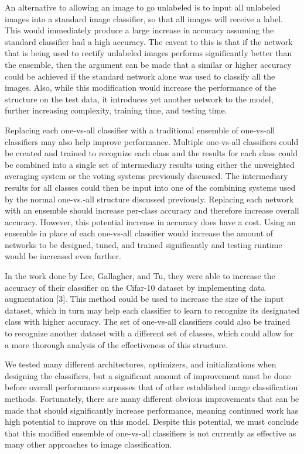\documentclass[10pt,twocolumn,letterpaper]{article}
\begin{document}
An alternative to allowing an image to go unlabeled is to input all unlabeled images into a standard image classifier, so that all images will receive a label. This would immediately produce a large increase in accuracy assuming the standard classifier had a high accuracy. The caveat to this is that if the network that is being used to rectify unlabeled images performs significantly better than the ensemble, then the argument can be made that a similar or higher accuracy could be achieved if the standard network alone was used to classify all the images. Also, while this modification would increase the performance of the structure on the test data, it introduces yet another network to the model, further increasing complexity, training time, and testing time.

Replacing each one-vs-all classifier with a traditional ensemble of one-vs-all classifiers may also help improve performance. Multiple one-vs-all classifiers could be created and trained to recognize each class and the results for each class could be combined into a single set of intermediary results using either the unweighted averaging system or the voting systems previously discussed. The intermediary results for all classes could then be input into one of the combining systems used by the normal one-vs.-all structure discussed previously. Replacing each network with an ensemble should increase per-class accuracy and therefore increase overall accuracy. However, this potential increase in accuracy does have a cost. Using an ensemble in place of each one-vs-all classifier would increase the amount of networks to be designed, tuned, and trained significantly and testing runtime would be increased even further.

In the work done by Lee, Gallagher, and Tu,  they were able to increase the accuracy of their classifier on the Cifar-10 dataset by implementing data augmentation [3]. This method could be used to increase the size of the input dataset, which in turn may help each classifier to learn to recognize its designated class with higher accuracy. The set of one-vs-all classifiers could also be trained to recognize another dataset with a different set of classes, which could allow for a more thorough analysis of the effectiveness of this structure.

We tested many different architectures, optimizers, and initializations when designing the classifiers, but a significant amount of improvement must be done before overall performance surpasses that of other established image classification methods. Fortunately, there are many different obvious improvements that can be made that should significantly increase performance, meaning continued work has high potential to improve on this model. Despite this potential, we must conclude that this modified ensemble of one-vs-all classifiers is not currently as effective as many other approaches to image classification.
\end{document}
